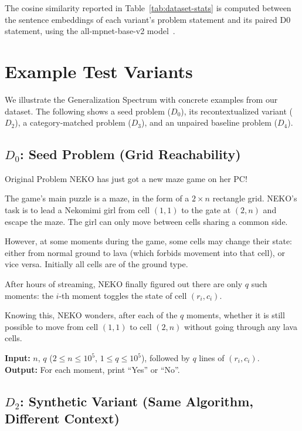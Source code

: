 \documentclass[]{bytedance_seed}
\theoremstyle{plain}
\theoremstyle{definition}
\theoremstyle{remark}
\begin{document}
The cosine similarity reported in Table~\ref{tab:dataset-stats} is computed between the sentence embeddings of each variant's problem statement and its paired D0 statement, using the all-mpnet-base-v2 model~\citep{reimers2019sentence}.

\section{Example Test Variants}
\label{app:examples}

We illustrate the Generalization Spectrum with concrete examples from our dataset. The following shows a seed problem ($D_0$), its recontextualized variant ($D_2$), a category-matched problem ($D_3$), and an unpaired baseline problem ($D_4$).

\subsection*{$D_0$: Seed Problem (Grid Reachability)}

\begin{problembox}{Original Problem}
NEKO has just got a new maze game on her PC!

The game's main puzzle is a maze, in the form of a $2 \times n$ rectangle grid. NEKO's task is to lead a Nekomimi girl from cell $(1, 1)$ to the gate at $(2, n)$ and escape the maze. The girl can only move between cells sharing a common side.

However, at some moments during the game, some cells may change their state: either from normal ground to lava (which forbids movement into that cell), or vice versa. Initially all cells are of the ground type.

After hours of streaming, NEKO finally figured out there are only $q$ such moments: the $i$-th moment toggles the state of cell $(r_i, c_i)$.

Knowing this, NEKO wonders, after each of the $q$ moments, whether it is still possible to move from cell $(1, 1)$ to cell $(2, n)$ without going through any lava cells.

\vspace{1.5mm}
\noindent\textbf{Input:} $n$, $q$ ($2 \le n \le 10^5$, $1 \le q \le 10^5$), followed by $q$ lines of $(r_i, c_i)$.\\
\textbf{Output:} For each moment, print ``Yes'' or ``No''.
\end{problembox}

\subsection*{$D_2$: Synthetic Variant (Same Algorithm, Different Context)}
\end{document}

